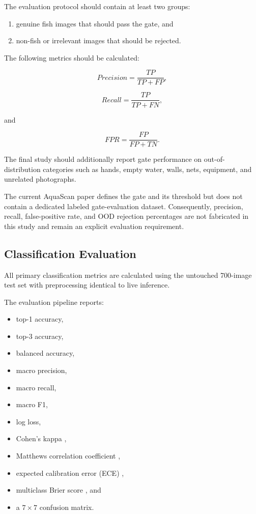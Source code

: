 \documentclass[conference]{IEEEtran}
\begin{document}
The evaluation protocol should contain at least two groups:

\begin{enumerate}
    \item genuine fish images that should pass the gate, and
    \item non-fish or irrelevant images that should be rejected.
\end{enumerate}

The following metrics should be calculated:

\begin{equation}
Precision=\frac{TP}{TP+FP},
\end{equation}

\begin{equation}
Recall=\frac{TP}{TP+FN},
\end{equation}

and

\begin{equation}
FPR=\frac{FP}{FP+TN}.
\end{equation}

The final study should additionally report gate performance on out-of-distribution categories such as hands, empty water, walls, nets, equipment, and unrelated photographs.

The current AquaScan paper defines the gate and its threshold but does not contain a dedicated labeled gate-evaluation dataset. Consequently, precision, recall, false-positive rate, and OOD rejection percentages are not fabricated in this study and remain an explicit evaluation requirement.

\subsection{Classification Evaluation}

All primary classification metrics are calculated using the untouched 700-image test set with preprocessing identical to live inference.

The evaluation pipeline reports:

\begin{itemize}
    \item top-1 accuracy,
    \item top-3 accuracy,
    \item balanced accuracy,
    \item macro precision,
    \item macro recall,
    \item macro F1,
    \item log loss,
    \item Cohen's kappa \cite{b20},
    \item Matthews correlation coefficient \cite{b21},
    \item expected calibration error (ECE) \cite{b23},
    \item multiclass Brier score \cite{b22}, and
    \item a $7\times7$ confusion matrix.
\end{itemize}
\end{document}
